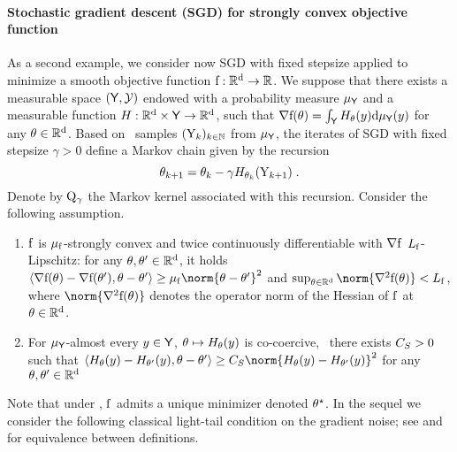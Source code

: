  \paragraph{Stochastic gradient descent (SGD) for strongly convex objective function}
 As a second example, we consider now SGD with fixed stepsize  applied to minimize a smooth objective function $\mathrm{f} : \mathbb{R}^{\mathrm{d}} \to \mathbb{R}$.  We suppose that there
 exists a measurable space $(\mathsf{Y},\mathcal{Y})$ endowed with a probability
 measure $\mu_{\mathsf{Y}}$ and a measurable function $H: \mathbb{R}^{\mathrm{d}} \times \mathsf{Y} \to \mathbb{R}^{\mathrm{d}}$, such that
 $\nabla \mathrm{f}(\theta) = \int_{\mathsf{Y}} H_{\theta}(y) \mathrm{d} \mu_{\mathsf{Y}}(y)$
 for any $\theta \in\mathbb{R}^{\mathrm{d}}$. Based on \iid~samples $(\mathrm{Y}_k)_{k \in\mathbb{N}}$ from $\mu_{\mathsf{Y}}$, the iterates of SGD with fixed stepsize $\gamma >0$ define a Markov chain given by the recursion
 \begin{equation}
   \label{eq:def_SGD}
   \theta_{k+1} = \theta_k - \gamma  H_{\theta_k}(\mathrm{Y}_{k+1}) \;.
 \end{equation}
Denote by ${\rm Q}_{\gamma}$ the Markov kernel associated with this recursion.
Consider the following assumption. %
\begin{assumptionSGD}
\label{ass:sgd_field}
\begin{enumerate}[wide, labelwidth=0pt, labelindent=0pt, itemsep=0mm, label=(\roman*)]
\item $\mathrm{f}$ is $\mu_{\mathrm{f}}$-strongly convex and twice continuously differentiable  with $\nabla \mathrm{f}$ $L_{\mathrm{f}}$-Lipschitz: for any $\theta,\theta' \in\mathbb{R}^{\mathrm{d}}$, it holds $\ps{\nabla \objf(\theta) - \nabla\objf(\theta')}{\theta-\theta'} \geq \muf \norm{\theta-\theta'}^2$ and $\sup_{\theta \in \rset^{\dims}} \norm{\nabla^2 \objf(\theta)} < \Lf$, where $\norm{\nabla^2 \objf(\theta)}$ denotes the operator norm of the Hessian of $\mathrm{f}$ at $\theta\in \mathbb{R}^{\mathrm{d}}$.
\item For $\mu_{\mathsf{Y}}$-almost every $y\in\mathsf{Y}$, $\theta \mapsto H_{\theta}(y)$ is co-coercive, \ie~there exists $C_S >0$ such that $\ps{\fieldH_{\theta}(y) - \fieldH_{\theta'}(y)}{\theta-\theta'} \geq \Ccoco \norm{\fieldH_{\theta}(y) - \fieldH_{\theta'}(y)}^2$ for any $\theta,\theta' \in \mathbb{R}^{\mathrm{d}}$
\end{enumerate}
\end{assumptionSGD}
Note that under , $\mathrm{f}$ admits a unique minimizer denoted  $\theta^{\star}$. In the sequel we consider the following classical light-tail condition on the gradient noise; see \cite{hsu2012tail,harvey2019tight} and for equivalence between definitions.
